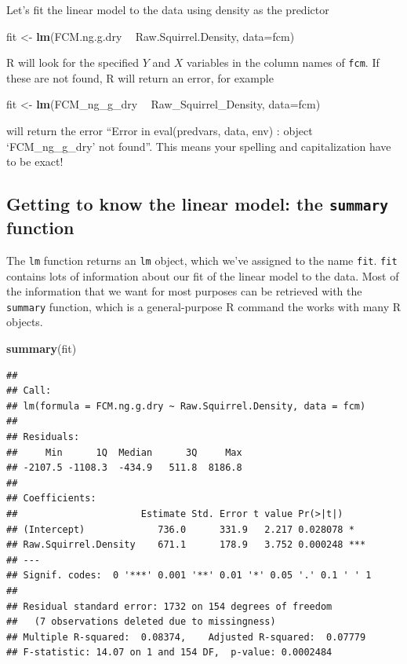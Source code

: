 \documentclass[]{book}
\newenvironment{Shaded}{\begin{snugshade}}{\end{snugshade}}
\newcommand{\KeywordTok}[1]{\textcolor[rgb]{0.13,0.29,0.53}{\textbf{#1}}}
\newcommand{\DataTypeTok}[1]{\textcolor[rgb]{0.13,0.29,0.53}{#1}}
\newcommand{\StringTok}[1]{\textcolor[rgb]{0.31,0.60,0.02}{#1}}
\newcommand{\OperatorTok}[1]{\textcolor[rgb]{0.81,0.36,0.00}{\textbf{#1}}}
\newcommand{\NormalTok}[1]{#1}
\theoremstyle{definition}
\theoremstyle{definition}
\theoremstyle{definition}
\theoremstyle{remark}
\begin{document}
Let's fit the linear model to the data using density as the predictor

\begin{Shaded}
\begin{Highlighting}[]
\NormalTok{  fit <-}\StringTok{ }\KeywordTok{lm}\NormalTok{(FCM.ng.g.dry }\OperatorTok{~}\StringTok{ }\NormalTok{Raw.Squirrel.Density, }\DataTypeTok{data=}\NormalTok{fcm)}
\end{Highlighting}
\end{Shaded}

R will look for the specified \(Y\) and \(X\) variables in the column
names of \texttt{fcm}. If these are not found, R will return an error,
for example

\begin{Shaded}
\begin{Highlighting}[]
\NormalTok{  fit <-}\StringTok{ }\KeywordTok{lm}\NormalTok{(FCM_ng_g_dry }\OperatorTok{~}\StringTok{ }\NormalTok{Raw_Squirrel_Density, }\DataTypeTok{data=}\NormalTok{fcm)}
\end{Highlighting}
\end{Shaded}

will return the error ``Error in eval(predvars, data, env) : object
`FCM\_ng\_g\_dry' not found''. This means your spelling and
capitalization have to be exact!

\subsection{\texorpdfstring{Getting to know the linear model: the
\texttt{summary}
function}{Getting to know the linear model: the summary function}}\label{getting-to-know-the-linear-model-the-summary-function}

The \texttt{lm} function returns an \texttt{lm} object, which we've
assigned to the name \texttt{fit}. \texttt{fit} contains lots of
information about our fit of the linear model to the data. Most of the
information that we want for most purposes can be retrieved with the
\texttt{summary} function, which is a general-purpose R command the
works with many R objects.

\begin{Shaded}
\begin{Highlighting}[]
\KeywordTok{summary}\NormalTok{(fit)}
\end{Highlighting}
\end{Shaded}

\begin{verbatim}
## 
## Call:
## lm(formula = FCM.ng.g.dry ~ Raw.Squirrel.Density, data = fcm)
## 
## Residuals:
##     Min      1Q  Median      3Q     Max 
## -2107.5 -1108.3  -434.9   511.8  8186.8 
## 
## Coefficients:
##                      Estimate Std. Error t value Pr(>|t|)    
## (Intercept)             736.0      331.9   2.217 0.028078 *  
## Raw.Squirrel.Density    671.1      178.9   3.752 0.000248 ***
## ---
## Signif. codes:  0 '***' 0.001 '**' 0.01 '*' 0.05 '.' 0.1 ' ' 1
## 
## Residual standard error: 1732 on 154 degrees of freedom
##   (7 observations deleted due to missingness)
## Multiple R-squared:  0.08374,    Adjusted R-squared:  0.07779 
## F-statistic: 14.07 on 1 and 154 DF,  p-value: 0.0002484
\end{verbatim}
\end{document}

